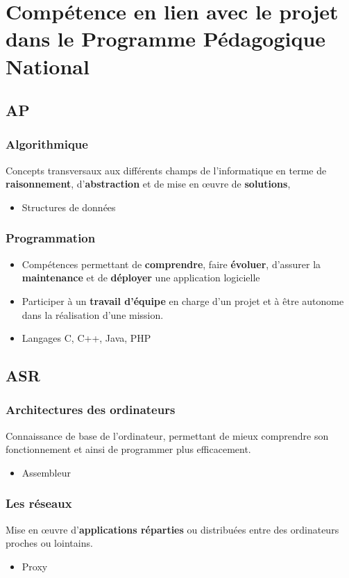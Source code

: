 \documentclass[12pt,a4paper,openany]{article}
\begin{document}
	\section{Compétence en lien avec le projet dans le Programme Pédagogique National}
	\begin{multicols}{2}
		\subsection{AP}
		\subsubsection{Algorithmique}
			Concepts transversaux aux différents champs de l’informatique en
				terme de \textbf{raisonnement}, d’\textbf{abstraction} et de mise en \oe{}uvre de \textbf{solutions},
				\begin{itemize}
					\item Structures de données 
				\end{itemize}
		\subsubsection{Programmation}
		\begin{itemize}
			\item Compétences permettant de \textbf{comprendre}, faire \textbf{évoluer}, d’assurer
				la \textbf{maintenance} et de \textbf{déployer} une application logicielle
			\item Participer à un \textbf{travail d’équipe} en charge d’un projet et à être
				autonome dans la réalisation d’une mission.
			\item Langages C, C++, Java, PHP	
		\end{itemize}
		\subsection{ASR} 
		\subsubsection{Architectures des ordinateurs}
		Connaissance de base de l'ordinateur, permettant de mieux comprendre son fonctionnement et ainsi de programmer
		plus efficacement.
		\begin{itemize}
			\item Assembleur  
		\end{itemize}
			\subsubsection{Les réseaux} 
				Mise en \oe{}uvre d’\textbf{applications réparties} ou distribuées entre des ordinateurs proches ou lointains.
				\begin{itemize}
					\item Proxy 
				\end{itemize}

\end{multicols}
\end{document}
